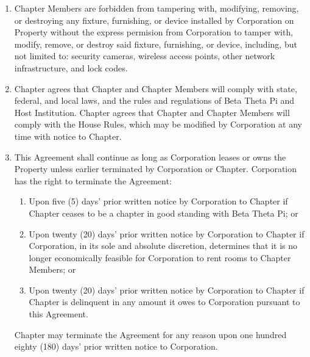 \documentclass[12pt]{article}
\begin{document}
\begin{enumerate}
        \item Chapter Members are forbidden from tampering with, modifying, removing, or destroying any fixture, furnishing, or device installed by Corporation on Property without the express permision from Corporation to tamper with, modify, remove, or destroy said fixture, furnishing, or device, including, but not limited to: security cameras, wireless access points, other network infrastructure, and lock codes.

        \item Chapter agrees that Chapter and Chapter Members will comply with state, federal, and local laws, and the rules and regulations of Beta Theta Pi and Host Institution.
                Chapter agrees that Chapter and Chapter Members will comply with the House Rules, which may be modified by Corporation at any time with notice to Chapter.

        \item This Agreement shall continue as long as Corporation leases or owns the Property unless earlier terminated by Corporation or Chapter. Corporation has the right to terminate the Agreement:

                \begin{enumerate}[label=\alph*.]
                        \item Upon five (5) days' prior written notice by Corporation to Chapter if Chapter ceases to be a chapter in good standing with Beta Theta Pi; or

                        \item Upon twenty (20) days' prior written notice by Corporation to Chapter if Corporation, in its sole and absolute discretion, determines that it is no longer economically feasible for Corporation to rent rooms to Chapter Members; or

                        \item Upon twenty (20) days' prior written notice by Corporation to Chapter if Chapter is delinquent in any amount it owes to Corporation pursuant to this Agreement.
                \end{enumerate}

        Chapter may terminate the Agreement for any reason upon one hundred eighty (180) days' prior written notice to Corporation.


\end{enumerate}
\end{document}
